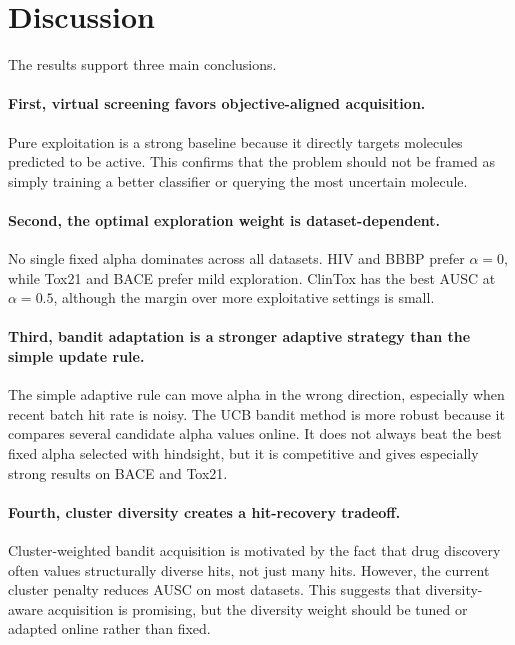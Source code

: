 \documentclass[10pt]{article}
\begin{document}
\section{Discussion}

The results support three main conclusions.

\paragraph{First, virtual screening favors objective-aligned acquisition.}
Pure exploitation is a strong baseline because it directly targets molecules predicted to be active. This confirms that the problem should not be framed as simply training a better classifier or querying the most uncertain molecule.

\paragraph{Second, the optimal exploration weight is dataset-dependent.}
No single fixed alpha dominates across all datasets. HIV and BBBP prefer $\alpha=0$, while Tox21 and BACE prefer mild exploration. ClinTox has the best AUSC at $\alpha=0.5$, although the margin over more exploitative settings is small.

\paragraph{Third, bandit adaptation is a stronger adaptive strategy than the simple update rule.}
The simple adaptive rule can move alpha in the wrong direction, especially when recent batch hit rate is noisy. The UCB bandit method is more robust because it compares several candidate alpha values online. It does not always beat the best fixed alpha selected with hindsight, but it is competitive and gives especially strong results on BACE and Tox21.

\paragraph{Fourth, cluster diversity creates a hit-recovery tradeoff.}
Cluster-weighted bandit acquisition is motivated by the fact that drug discovery often values structurally diverse hits, not just many hits. However, the current cluster penalty reduces AUSC on most datasets. This suggests that diversity-aware acquisition is promising, but the diversity weight should be tuned or adapted online rather than fixed.
\end{document}
